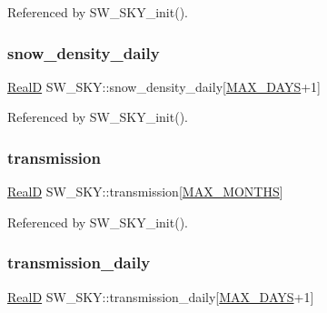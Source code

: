 Referenced by S\+W\+\_\+\+S\+K\+Y\+\_\+init().

\mbox{\label{struct_s_w___s_k_y_af459243a729395ba95b534bb03af3eaa}} 
\subsubsection{\texorpdfstring{snow\+\_\+density\+\_\+daily}{snow\_density\_daily}}
{\footnotesize\ttfamily \hyperlink{generic_8h_af1c105fd5732f70b91ddaeda0cc340e3}{RealD} S\+W\+\_\+\+S\+K\+Y\+::snow\+\_\+density\+\_\+daily\mbox{[}\hyperlink{_times_8h_a01f08d46080872b9f4284873b7f9dee4}{M\+A\+X\+\_\+\+D\+A\+YS}+1\mbox{]}}



Referenced by S\+W\+\_\+\+S\+K\+Y\+\_\+init().

\mbox{\label{struct_s_w___s_k_y_aa6e86848395fa97cf26c2dddebbb23a0}} 
\subsubsection{\texorpdfstring{transmission}{transmission}}
{\footnotesize\ttfamily \hyperlink{generic_8h_af1c105fd5732f70b91ddaeda0cc340e3}{RealD} S\+W\+\_\+\+S\+K\+Y\+::transmission\mbox{[}\hyperlink{_times_8h_a9c97e6841188b672e984a4eba7479277}{M\+A\+X\+\_\+\+M\+O\+N\+T\+HS}\mbox{]}}



Referenced by S\+W\+\_\+\+S\+K\+Y\+\_\+init().

\mbox{\label{struct_s_w___s_k_y_a62644fcb44b1b155c44df63060efb6f1}} 
\subsubsection{\texorpdfstring{transmission\+\_\+daily}{transmission\_daily}}
{\footnotesize\ttfamily \hyperlink{generic_8h_af1c105fd5732f70b91ddaeda0cc340e3}{RealD} S\+W\+\_\+\+S\+K\+Y\+::transmission\+\_\+daily\mbox{[}\hyperlink{_times_8h_a01f08d46080872b9f4284873b7f9dee4}{M\+A\+X\+\_\+\+D\+A\+YS}+1\mbox{]}}



